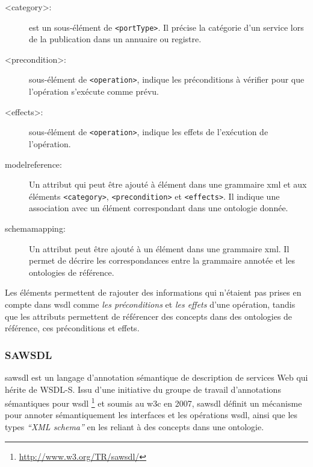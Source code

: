     \renewcommand{\descriptionlabel}[1]{\hspace{0.5cm}\textbullet~\texttt{#1}}
    \begin{description}
    \item [<category>:] est un sous-élément de \texttt{<portType>}. Il
      précise la catégorie d'un service lors de la publication dans un
      annuaire ou registre.

    \item [<precondition>:] sous-élément de \texttt{<operation>},
      indique les préconditions à vérifier pour que l'opération
      s'exécute comme prévu.

    \item [<effects>:] sous-élément de \texttt{<operation>}, indique
      les effets de l'exécution de l'opération.

    \item [modelreference:] Un attribut qui peut être ajouté à élément
      dans une grammaire \acrshort{xml} et aux éléments
      \texttt{<category>}, \texttt{<precondition>} et
      \texttt{<effects>}. Il indique une association avec un élément
      correspondant dans une ontologie donnée.

    \item [schemamapping:] Un attribut peut être ajouté à un élément
      dans une grammaire \acrshort{xml}. Il permet de décrire les
      correspondances entre la grammaire annotée et les ontologies de
      référence.
    \end{description}
    \enddescription
    \bigskip

    Les éléments permettent de rajouter des informations
    qui n'étaient pas prises en compte dans \acrshort{wsdl} comme
    \emph{les préconditions} et \emph{les effets} d'une opération,
    tandis que les attributs permettent de référencer des concepts
    dans des ontologies de référence, ces préconditions et effets.

    \subsubsection{SAWSDL}
    \acrshort{sawsdl} \cite{kopecky2007sawsdl} est un langage
    d'annotation sémantique de description de services Web qui hérite
    de \textsc{WSDL-S}. Issu d'une initiative du groupe de travail
    d'annotations sémantiques pour \acrshort{wsdl}
    \footnote{\url{http://www.w3.org/TR/sawsdl/}} et soumis au
    \acrshort{w3c} en 2007, \acrshort{sawsdl} définit un mécanisme
    pour annoter sémantiquement les interfaces et les opérations
    \acrshort{wsdl}, ainsi que les types \textit{``XML schema''} en
    les reliant à des concepts dans une ontologie.\medskip

